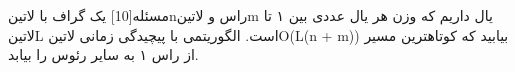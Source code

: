 
‌مسئله[10]
یک گراف با ‌لاتین{n}‌راس و ‌لاتین{m} یال داریم که وزن هر یال عددی بین ۱ تا ‌لاتین{L} است. الگوریتمی با پیچیدگی زمانی ‌لاتین{O(L(n + m))} بیابید که کوتاهترین مسیر از راس ۱ به سایر رئوس را بیابد.













